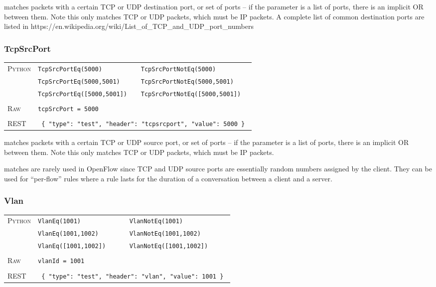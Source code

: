  matches packets with a certain TCP or UDP destination port, or set of ports -- if the 
parameter is a list of ports, there is an implicit OR between them.  Note this only matches TCP or UDP packets,
which must be IP packets.  A complete list of common destination ports are listed in 
https://en.wikipedia.org/wiki/List\_of\_TCP\_and\_UDP\_port\_numbers

\subsubsection{TcpSrcPort}

\bigskip
\begin{tabularx}{\linewidth}{lXX}
\textsc{Python}   & \texttt{TcpSrcPortEq(5000)}    & \texttt{TcpSrcPortNotEq(5000)} \\
    & \texttt{TcpSrcPortEq(5000,5001)}  & \texttt{TcpSrcPortNotEq(5000,5001)} \\
    & \texttt{TcpSrcPortEq([5000,5001])}  & \texttt{TcpSrcPortNotEq([5000,5001])} \\ \\
\textsc{Raw}    & \texttt{tcpSrcPort = 5000}     & \\ \\
\textsc{REST} & \multicolumn{2}{l}{\texttt{ \{ "type": "test", "header": "tcpsrcport", "value": 5000 \} }} 
\end{tabularx}

 matches packets with a certain TCP or UDP source port, or set of ports -- if the 
parameter is a list of ports, there is an implicit OR between them.  Note this only matches TCP or UDP packets,
which must be IP packets.  

 matches are rarely used in OpenFlow since TCP and UDP source ports are essentially random
numbers assigned by the client.  They can be used for ``per-flow'' rules where a rule lasts for the 
duration of a conversation between a client and a server.  

\subsubsection{Vlan}

\bigskip
\begin{tabularx}{\linewidth}{lXX}
\textsc{Python}   & \texttt{VlanEq(1001)}    & \texttt{VlanNotEq(1001)} \\
    & \texttt{VlanEq(1001,1002)}  & \texttt{VlanNotEq(1001,1002)} \\
    & \texttt{VlanEq([1001,1002])}  & \texttt{VlanNotEq([1001,1002])} \\ \\
\textsc{Raw}    & \texttt{vlanId = 1001}     & \\ \\
\textsc{REST} & \multicolumn{2}{l}{\texttt{ \{ "type": "test", "header": "vlan", "value": 1001 \} }} 
\end{tabularx}

